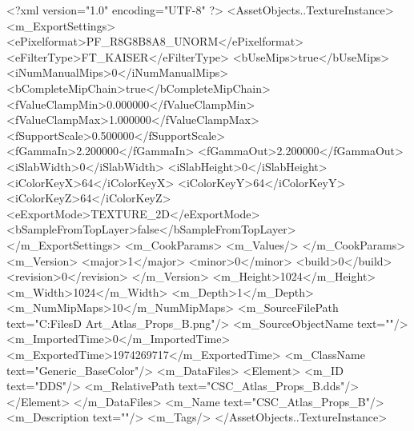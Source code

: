 <?xml version="1.0" encoding="UTF-8" ?>
<AssetObjects..TextureInstance>
	<m_ExportSettings>
		<ePixelformat>PF_R8G8B8A8_UNORM</ePixelformat>
		<eFilterType>FT_KAISER</eFilterType>
		<bUseMips>true</bUseMips>
		<iNumManualMips>0</iNumManualMips>
		<bCompleteMipChain>true</bCompleteMipChain>
		<fValueClampMin>0.000000</fValueClampMin>
		<fValueClampMax>1.000000</fValueClampMax>
		<fSupportScale>0.500000</fSupportScale>
		<fGammaIn>2.200000</fGammaIn>
		<fGammaOut>2.200000</fGammaOut>
		<iSlabWidth>0</iSlabWidth>
		<iSlabHeight>0</iSlabHeight>
		<iColorKeyX>64</iColorKeyX>
		<iColorKeyY>64</iColorKeyY>
		<iColorKeyZ>64</iColorKeyZ>
		<eExportMode>TEXTURE_2D</eExportMode>
		<bSampleFromTopLayer>false</bSampleFromTopLayer>
	</m_ExportSettings>
	<m_CookParams>
		<m_Values/>
	</m_CookParams>
	<m_Version>
		<major>1</major>
		<minor>0</minor>
		<build>0</build>
		<revision>0</revision>
	</m_Version>
	<m_Height>1024</m_Height>
	<m_Width>1024</m_Width>
	<m_Depth>1</m_Depth>
	<m_NumMipMaps>10</m_NumMipMaps>
	<m_SourceFilePath text="C:\Users\Shadow\Desktop\Working Files\3D Art\Textures\CSC_Atlas_Props_B.png"/>
	<m_SourceObjectName text=""/>
	<m_ImportedTime>0</m_ImportedTime>
	<m_ExportedTime>1974269717</m_ExportedTime>
	<m_ClassName text="Generic_BaseColor"/>
	<m_DataFiles>
		<Element>
			<m_ID text="DDS"/>
			<m_RelativePath text="CSC_Atlas_Props_B.dds"/>
		</Element>
	</m_DataFiles>
	<m_Name text="CSC_Atlas_Props_B"/>
	<m_Description text=""/>
	<m_Tags/>
</AssetObjects..TextureInstance>


